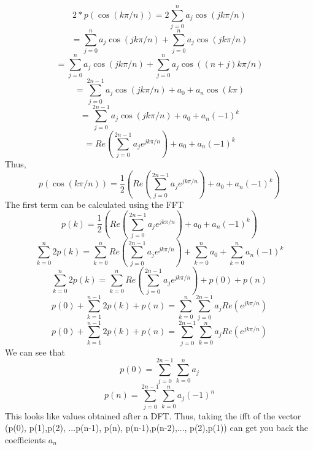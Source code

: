 \documentclass[letterpaper,12pt]{article}
\begin{document}
\begin{enumerate}
\[2 * p ( \cos ( k \pi / n ) ) = 2 \sum_{j=0}^n a_j \cos ( j k \pi / n ) \]
\[= \sum_{j=0}^n a_j \cos ( j k \pi / n ) + \sum_{j=0}^n a_j \cos ( j k \pi / n ) \]
\[= \sum_{j=0}^n a_j \cos ( j k \pi / n ) + \sum_{j=0}^n a_j \cos ( (n+j) k \pi / n ) \]
\[= \sum_{j=0}^{2n-1} a_j \cos ( j k \pi / n ) + a_0 +a_n \cos ( k \pi ) \]
\[= \sum_{j=0}^{2n-1} a_j \cos ( j k \pi / n ) + a_0 +a_n (-1)^k \]
\[= Re(\sum_{j=0}^{2n-1} a_j e^{ j k \pi / n  }) + a_0 +a_n (-1)^k \]
Thus, 
\[ p ( \cos ( k \pi / n ) ) = \frac{1}{2} (Re(\sum_{j=0}^{2n-1} a_j e^{ j k \pi / n  }) + a_0 +a_n (-1)^k) \]
The first term can be calculated using the FFT
\[ p ( k) = \frac{1}{2} (Re(\sum_{j=0}^{2n-1} a_j e^{ j k \pi / n  }) + a_0 +a_n (-1)^k) \]
\[ \sum_{k=0}^n 2p ( k) = \sum_{k=0}^n  Re(\sum_{j=0}^{2n-1} a_j e^{ j k \pi / n  }) +  \sum_{k=0}^n  a_0 + \sum_{k=0}^n a_n (-1)^k \]
\[ \sum_{k=0}^n 2 p ( k) = \sum_{k=0}^n  Re(\sum_{j=0}^{2n-1} a_j e^{ j k \pi / n  }) +  p(0)+ p(n)\]
\[ p (0) +\sum_{k=1}^{n-1} 2 p ( k) + p(n) = \sum_{k=0}^n  \sum_{j=0}^{2n-1} a_j Re(e^{ j k \pi / n  }) \]
\[ p (0) +\sum_{k=1}^{n-1} 2 p ( k) + p(n) = \sum_{j=0}^{2n-1}  \sum_{k=0}^n  a_j Re(e^{ j k \pi / n  }) \]
We can see that
\[ p (0)  = \sum_{j=0}^{2n-1}  \sum_{k=0}^n  a_j  \]
\[ p (n)  = \sum_{j=0}^{2n-1}  \sum_{k=0}^n  a_j (-1)^n \]
This looks like values obtained after a DFT.
Thus, taking the ifft of the vector (p(0), p(1),p(2), ...p(n-1), p(n), p(n-1),p(n-2),..., p(2),p(1)) can get you back the coefficients $a_n$
\end{enumerate}
\end{document}
